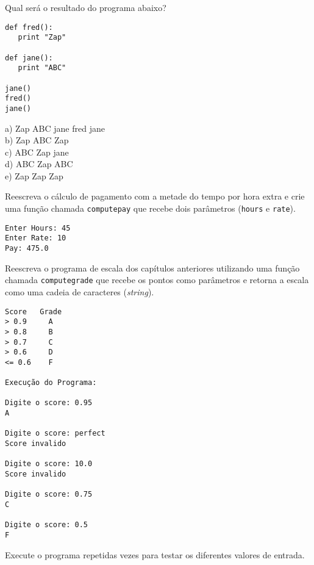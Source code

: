 \begin{ex}
Qual será o resultado do programa abaixo?
\beforeverb
\begin{verbatim}
def fred():
   print "Zap"

def jane():
   print "ABC"

jane()
fred()
jane()
\end{verbatim}
\afterverb
%
a) Zap ABC jane fred jane\\
b) Zap ABC Zap\\
c) ABC Zap jane\\
d) ABC Zap ABC\\
e) Zap Zap Zap
\end{ex}

\begin{ex}

Reescreva o cálculo de pagamento com a metade do tempo por hora extra e crie
uma função chamada {\tt computepay} que recebe dois parâmetros ({\tt hours} e 
{\tt rate}).
\begin{verbatim}
Enter Hours: 45
Enter Rate: 10
Pay: 475.0
\end{verbatim}
\end{ex}

\begin{ex}

Reescreva o programa de escala dos capítulos anteriores utilizando uma função
chamada {\tt computegrade} que recebe os pontos como parâmetros e retorna a
escala como uma cadeia de caracteres ({\it string}).
\begin{verbatim}
Score   Grade
> 0.9     A
> 0.8     B
> 0.7     C
> 0.6     D
<= 0.6    F

Execução do Programa:

Digite o score: 0.95
A

Digite o score: perfect
Score invalido

Digite o score: 10.0
Score invalido

Digite o score: 0.75
C

Digite o score: 0.5
F
\end{verbatim}

Execute o programa repetidas vezes para testar os diferentes valores de entrada.
\end{ex}